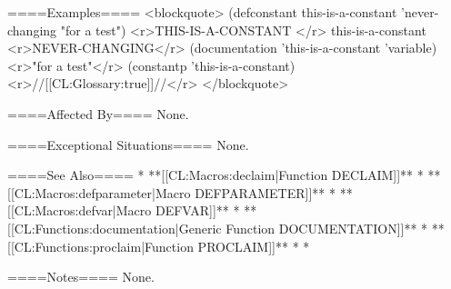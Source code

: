 ====Examples====
<blockquote>
(defconstant this-is-a-constant 'never-changing "for a test") <r>THIS-IS-A-CONSTANT </r>
this-is-a-constant <r>NEVER-CHANGING</r>
(documentation 'this-is-a-constant 'variable) <r>"for a test"</r>
(constantp 'this-is-a-constant) <r>//[[CL:Glossary:true]]//</r>
</blockquote>

====Affected By====
None.

====Exceptional Situations====
None.

====See Also====
  * **[[CL:Macros:declaim|Function DECLAIM]]**
  * **[[CL:Macros:defparameter|Macro DEFPARAMETER]]**
  * **[[CL:Macros:defvar|Macro DEFVAR]]**
  * **[[CL:Functions:documentation|Generic Function DOCUMENTATION]]**
  * **[[CL:Functions:proclaim|Function PROCLAIM]]**
  * {\secref\ConstantVars}
  * {\secref\Compilation}

====Notes====
None.

   
